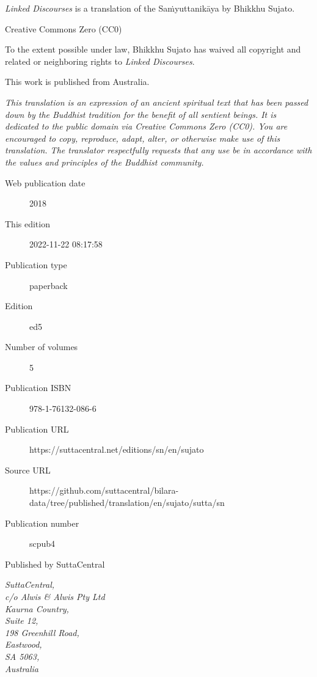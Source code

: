 \documentclass[12pt,openany]{book}%
\begin{document}
\begin{footnotesize}

\textit{Linked Discourses} is a translation of the Saṁyuttanikāya by Bhikkhu Sujato.

\medskip

Creative Commons Zero (CC0)

To the extent possible under law, Bhikkhu Sujato has waived all copyright and related or neighboring rights to \textit{Linked Discourses}.

\medskip

This work is published from Australia.

\begin{center}
\textit{This translation is an expression of an ancient spiritual text that has been passed down by the Buddhist tradition for the benefit of all sentient beings. It is dedicated to the public domain via Creative Commons Zero (CC0). You are encouraged to copy, reproduce, adapt, alter, or otherwise make use of this translation. The translator respectfully requests that any use be in accordance with the values and principles of the Buddhist community.}
\end{center}

\medskip

\begin{description}
    \item[Web publication date] 2018
    \item[This edition] 2022-11-22 08:17:58
    \item[Publication type] paperback
    \item[Edition] ed5
    \item[Number of volumes] 5
    \item[Publication ISBN] 978-1-76132-086-6
    \item[Publication URL] https://suttacentral.net/editions/sn/en/sujato
    \item[Source URL] https://github.com/suttacentral/bilara-data/tree/published/translation/en/sujato/sutta/sn
    \item[Publication number] scpub4
\end{description}

\medskip

Published by SuttaCentral

\medskip

\textit{SuttaCentral,\\
c/o Alwis \& Alwis Pty Ltd\\
Kaurna Country,\\
Suite 12,\\
198 Greenhill Road,\\
Eastwood,\\
SA 5063,\\
Australia}

\end{footnotesize}
\end{document}
